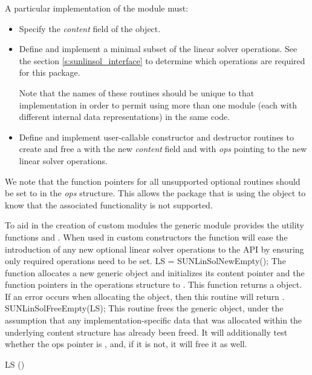 A particular implementation of the {\sunlinsol} module must:
\begin{itemize}
\item Specify the {\em content} field of the  object.
\item Define and implement a minimal subset of the linear solver
  operations. See the section \ref{s:sunlinsol_interface} to determine which
  {\sunlinsol} operations are required for this {\sundials} package.

  Note that the names of these routines should be unique to that
  implementation in order to permit using more than one {\sunlinsol}
  module (each with different  internal data
  representations) in the same code.
\item Define and implement user-callable constructor and destructor
  routines to create and free a  with
  the new {\em content} field and with {\em ops} pointing to the
  new linear solver operations.
\end{itemize}

We note that the function pointers for all unsupported optional
routines should be set to  in the \emph{ops} structure.  This
allows the {\sundials} package that is using the {\sunlinsol} object
to know that the associated functionality is not supported.

To aid in the creation of custom {\sunlinsol} modules the generic {\sunlinsol}
module provides the utility functions  and .
When used in custom {\sunlinsol} constructors the function  will
ease the introduction of any new optional linear solver operations to the {\sunlinsol}
API by ensuring only required operations need to be set.
%
%
{
  LS = SUNLinSolNewEmpty();
}
{
  The function  allocates a new generic {\sunlinsol}
  object and initializes its content pointer and the function pointers in the
  operations structure to .
}
{}
{
  This function returns a  object. If an error occurs when
  allocating the object, then this routine will return .
}
{}
%
%
{
  SUNLinSolFreeEmpty(LS);
}
{
  This routine frees the generic  object, under the assumption that any
  implementation-specific data that was allocated within the underlying content structure
  has already been freed. It will additionally test whether the ops pointer is ,
  and, if it is not, it will free it as well.
}
{
  \begin{args}[LS]
  \item[LS] ()
  \end{args}
}
{}
{}


